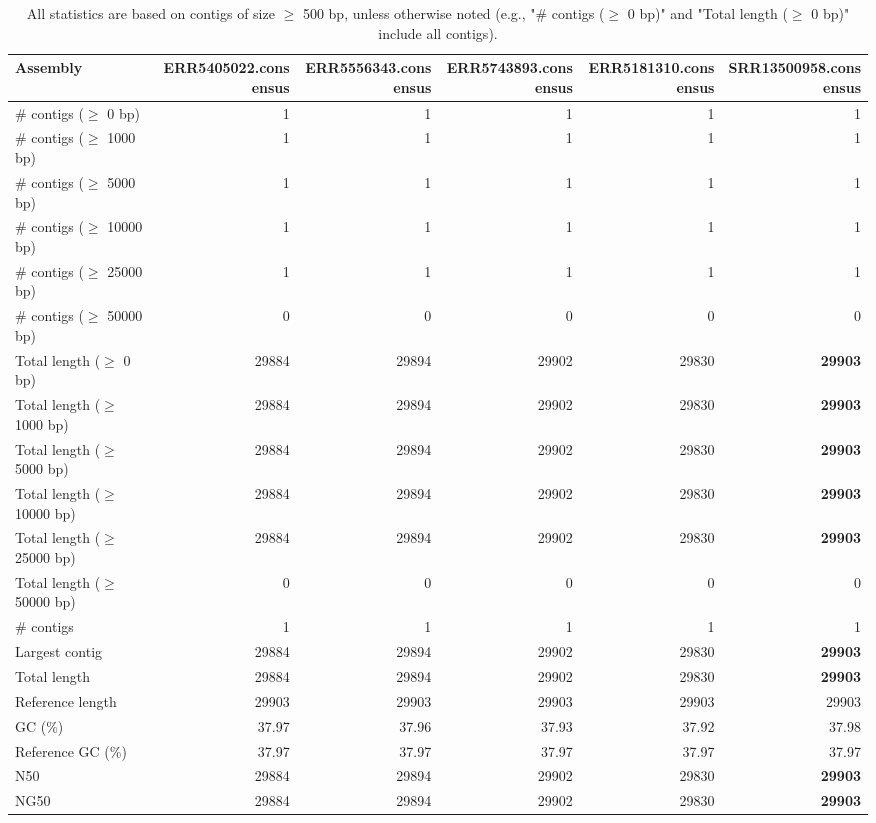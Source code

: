 \documentclass[12pt,a4paper]{article}
\begin{document}
\begin{table}[ht]
\begin{center}
\caption{All statistics are based on contigs of size $\geq$ 500 bp, unless otherwise noted (e.g., "\# contigs ($\geq$ 0 bp)" and "Total length ($\geq$ 0 bp)" include all contigs).}
\begin{tabular}{|l*{5}{|r}|}
\hline
Assembly & ERR5405022.consensus & ERR5556343.consensus & ERR5743893.consensus & ERR5181310.consensus & SRR13500958.consensus \\ \hline
\# contigs ($\geq$ 0 bp) & 1 & 1 & 1 & 1 & 1 \\ \hline
\# contigs ($\geq$ 1000 bp) & 1 & 1 & 1 & 1 & 1 \\ \hline
\# contigs ($\geq$ 5000 bp) & 1 & 1 & 1 & 1 & 1 \\ \hline
\# contigs ($\geq$ 10000 bp) & 1 & 1 & 1 & 1 & 1 \\ \hline
\# contigs ($\geq$ 25000 bp) & 1 & 1 & 1 & 1 & 1 \\ \hline
\# contigs ($\geq$ 50000 bp) & 0 & 0 & 0 & 0 & 0 \\ \hline
Total length ($\geq$ 0 bp) & 29884 & 29894 & 29902 & 29830 & {\bf 29903} \\ \hline
Total length ($\geq$ 1000 bp) & 29884 & 29894 & 29902 & 29830 & {\bf 29903} \\ \hline
Total length ($\geq$ 5000 bp) & 29884 & 29894 & 29902 & 29830 & {\bf 29903} \\ \hline
Total length ($\geq$ 10000 bp) & 29884 & 29894 & 29902 & 29830 & {\bf 29903} \\ \hline
Total length ($\geq$ 25000 bp) & 29884 & 29894 & 29902 & 29830 & {\bf 29903} \\ \hline
Total length ($\geq$ 50000 bp) & 0 & 0 & 0 & 0 & 0 \\ \hline
\# contigs & 1 & 1 & 1 & 1 & 1 \\ \hline
Largest contig & 29884 & 29894 & 29902 & 29830 & {\bf 29903} \\ \hline
Total length & 29884 & 29894 & 29902 & 29830 & {\bf 29903} \\ \hline
Reference length & 29903 & 29903 & 29903 & 29903 & 29903 \\ \hline
GC (\%) & 37.97 & 37.96 & 37.93 & 37.92 & 37.98 \\ \hline
Reference GC (\%) & 37.97 & 37.97 & 37.97 & 37.97 & 37.97 \\ \hline
N50 & 29884 & 29894 & 29902 & 29830 & {\bf 29903} \\ \hline
NG50 & 29884 & 29894 & 29902 & 29830 & {\bf 29903} \\ \hline

\end{tabular}
\end{center}
\end{table}
\end{document}
